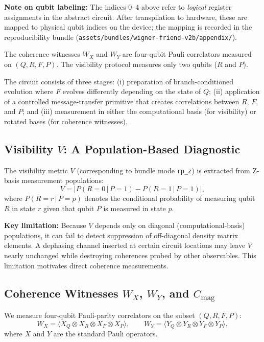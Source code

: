 \documentclass[11pt]{article}
\begin{document}
\noindent\textbf{Note on qubit labeling:} The indices 0--4 above refer to \emph{logical} register assignments in the abstract circuit. After transpilation to hardware, these are mapped to physical qubit indices on the device; the mapping is recorded in the reproducibility bundle (\texttt{assets/bundles/wigner-friend-v2b/appendix/}).

The coherence witnesses $W_X$ and $W_Y$ are four-qubit Pauli correlators measured on $(Q, R, F, P)$. The visibility protocol measures only two qubits ($R$ and $P$).

The circuit consists of three stages: (i) preparation of branch-conditioned evolution where $F$ evolves differently depending on the state of $Q$; (ii) application of a controlled message-transfer primitive that creates correlations between $R$, $F$, and $P$; and (iii) measurement in either the computational basis (for visibility) or rotated bases (for coherence witnesses).

\subsection{Visibility \texorpdfstring{$V$}{V}: A Population-Based Diagnostic}
\label{subsec:visibility}

The visibility metric $V$ (corresponding to bundle mode \texttt{rp\_z}) is extracted from Z-basis measurement populations:
\begin{equation}
V = \bigl| P(R=0 \,|\, P=1) - P(R=1 \,|\, P=1) \bigr|,
\end{equation}
where $P(R=r \,|\, P=p)$ denotes the conditional probability of measuring qubit $R$ in state $r$ given that qubit $P$ is measured in state $p$.

\textbf{Key limitation:} Because $V$ depends only on diagonal (computational-basis) populations, it can fail to detect suppression of off-diagonal density matrix elements. A dephasing channel inserted at certain circuit locations may leave $V$ nearly unchanged while destroying coherences probed by other observables. This limitation motivates direct coherence measurements.

\subsection{Coherence Witnesses
  \texorpdfstring{$W_X$}{WX},
  \texorpdfstring{$W_Y$}{WY},
  and \texorpdfstring{$C_\mathrm{mag}$}{Cmag}}
\label{subsec:witnesses}

We measure four-qubit Pauli-parity correlators on the subset $(Q, R, F, P)$:
\begin{equation}
W_X = \langle X_Q \otimes X_R \otimes X_F \otimes X_P \rangle, \qquad
W_Y = \langle Y_Q \otimes Y_R \otimes Y_F \otimes Y_P \rangle,
\end{equation}
where $X$ and $Y$ are the standard Pauli operators.
\end{document}
